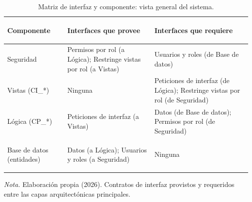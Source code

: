 \begin{table}[H]
  \centering
  \caption{Matriz de interfaz y componente: vista general del sistema.}
  \label{tab:matriz_componentes_sistema}
  \begin{tabularx}{\textwidth}{|>{\bfseries\raggedright\arraybackslash}p{3.2cm}|>{\raggedright\arraybackslash}X|>{\raggedright\arraybackslash}X|}
    \hline
    \textbf{Componente} & \textbf{Interfaces que provee} & \textbf{Interfaces que requiere} \\ \hline
    Seguridad & Permisos por rol (a Lógica); Restringe vistas por rol (a Vistas) & Usuarios y roles (de Base de datos) \\ \hline
    Vistas (CI\_*) & Ninguna & Peticiones de interfaz (de Lógica); Restringe vistas por rol (de Seguridad) \\ \hline
    Lógica (CP\_*) & Peticiones de interfaz (a Vistas) & Datos (de Base de datos); Permisos por rol (de Seguridad) \\ \hline
    Base de datos (entidades) & Datos (a Lógica); Usuarios y roles (a Seguridad) & Ninguna \\ \hline
  \end{tabularx}
  \par\vspace{0.2cm}
  {\raggedright \small \emph{Nota.} Elaboración propia (2026). Contratos de interfaz provistos y requeridos entre las capas arquitectónicas principales.\par}
\end{table}

